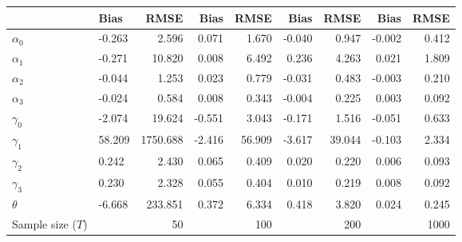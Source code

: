 
\begin{tabular}[t]{llrrrrrrr}
\toprule
  & Bias & RMSE & Bias & RMSE & Bias & RMSE & Bias & RMSE\\
\midrule
$\alpha_{0}$ & -0.263 & 2.596 & 0.071 & 1.670 & -0.040 & 0.947 & -0.002 & 0.412\\
$\alpha_{1}$ & -0.271 & 10.820 & 0.008 & 6.492 & 0.236 & 4.263 & 0.021 & 1.809\\
$\alpha_{2}$ & -0.044 & 1.253 & 0.023 & 0.779 & -0.031 & 0.483 & -0.003 & 0.210\\
$\alpha_{3}$ & -0.024 & 0.584 & 0.008 & 0.343 & -0.004 & 0.225 & 0.003 & 0.092\\
$\gamma_{0}$ & -2.074 & 19.624 & -0.551 & 3.043 & -0.171 & 1.516 & -0.051 & 0.633\\
$\gamma_{1}$ & 58.209 & 1750.688 & -2.416 & 56.909 & -3.617 & 39.044 & -0.103 & 2.334\\
$\gamma_{2}$ & 0.242 & 2.430 & 0.065 & 0.409 & 0.020 & 0.220 & 0.006 & 0.093\\
$\gamma_{3}$ & 0.230 & 2.328 & 0.055 & 0.404 & 0.010 & 0.219 & 0.008 & 0.092\\
$\theta$ & -6.668 & 233.851 & 0.372 & 6.334 & 0.418 & 3.820 & 0.024 & 0.245\\
Sample size ($T$) &  & 50 &  & 100 &  & 200 &  & 1000\\
\bottomrule
\end{tabular}
